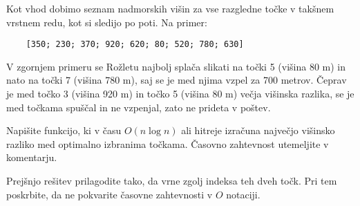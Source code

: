 \documentclass[arhiv]{../izpit}
\begin{document}
Kot vhod dobimo seznam nadmorskih višin za vse razgledne točke v takšnem vrstnem redu, kot si sledijo po poti. Na primer:
\begin{verbatim}
    [350; 230; 370; 920; 620; 80; 520; 780; 630]
\end{verbatim}
V zgornjem primeru se Rožletu najbolj splača slikati na točki 5 (višina 80 m) in nato na točki 7 (višina 780 m), saj se je med njima vzpel za 700 metrov. Čeprav je med točko 3 (višina 920 m) in točko 5 (višina 80 m) večja višinska razlika, se je med točkama spuščal in ne vzpenjal, zato ne prideta v poštev.


\podnaloga
Napišite funkcijo, ki v času $O(n \log n)$ ali hitreje izračuna največjo višinsko razliko med optimalno izbranima točkama. Časovno zahtevnost utemeljite v komentarju.

\podnaloga
Prejšnjo rešitev prilagodite tako, da vrne zgolj indeksa teh dveh točk. Pri tem poskrbite, da ne pokvarite časovne zahtevnosti v $O$ notaciji.
\end{document}
